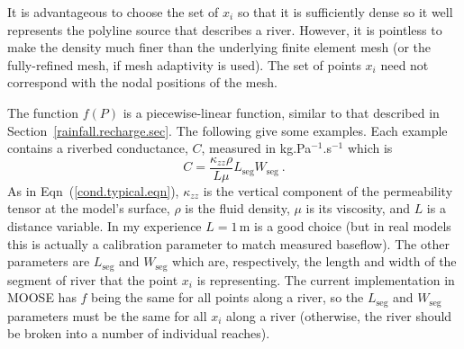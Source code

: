\documentclass[]{scrreprt}
\begin{document}
It is advantageous to choose the set of $x_{i}$ so that it is
sufficiently dense so it well represents the polyline source that
describes a river.  However, it is pointless to make the density much
finer than the underlying finite element mesh (or the fully-refined
mesh, if mesh adaptivity is used).  The set of points $x_{i}$ need not
correspond with the nodal positions of the mesh.

The function $f(P)$ is a piecewise-linear function, similar to
that described in Section~\ref{rainfall.recharge.sec}.   The following
give some examples.   Each example contains a riverbed conductance,
$C$, measured in kg.Pa$^{-1}$.s$^{-1}$ which is
\begin{equation}
C = \frac{\kappa_{zz}\rho}{L\mu}L_{\mathrm{seg}}W_{\mathrm{seg}} \ .
\end{equation}
As in Eqn~(\ref{cond.typical.eqn}), $\kappa_{zz}$ is the vertical
component of the permeability tensor at the model's surface, $\rho$ is
the fluid density, $\mu$ is its viscosity, and $L$ is a distance
variable.  In my experience $L=1$\,m is a good choice (but in real
models this is actually a calibration parameter to match measured
baseflow).  The other parameters are $L_{\mathrm{seg}}$ and
$W_{\mathrm{seg}}$ which are, respectively, the length and width of
the segment of river that the point $x_{i}$ is representing.  The
current implementation in MOOSE has $f$ being the same for all
points along a river, so the $L_{\mathrm{seg}}$ and $W_{\mathrm{seg}}$
parameters must be the same for all $x_{i}$ along a river (otherwise,
the river should be broken into a number of individual reaches).
\end{document}
